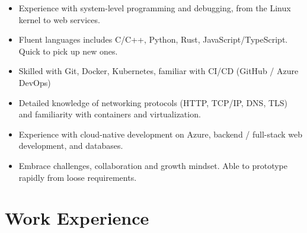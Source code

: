   \begin{itemize}
    \setlength\itemsep{0.1\parskip}
    \item Experience with system-level programming and debugging, from the Linux kernel to web services.
    \item Fluent languages includes C/C++, Python, Rust, JavaScript/TypeScript. Quick to pick up new ones.
    \item Skilled with Git, Docker, Kubernetes, familiar with CI/CD (GitHub / Azure DevOps)
    \item Detailed knowledge of networking protocols (HTTP, TCP/IP, DNS, TLS) and familiarity with containers and virtualization.
    \item Experience with cloud-native development on Azure, backend / full-stack web development, and databases.
    \item Embrace challenges, collaboration and growth mindset. Able to prototype rapidly from loose requirements.
  \end{itemize}

  \section{Work Experience}

